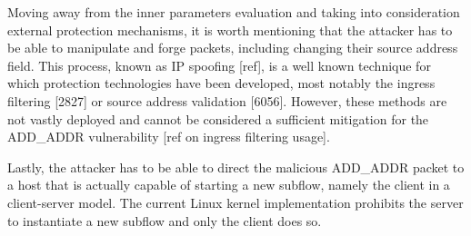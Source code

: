 Moving away from the inner parameters evaluation and taking into consideration external protection mechanisms, it is worth mentioning that the attacker has to be able to manipulate and forge packets, including changing their source address field. This process, known as IP spoofing [ref], is a well known technique for which protection technologies have been developed, most notably the ingress filtering [2827] or source address validation [6056]. However, these methods are not vastly deployed and cannot be considered a sufficient mitigation for the ADD\_ADDR vulnerability [ref on ingress filtering usage].

Lastly, the attacker has to be able to direct the malicious ADD\_ADDR packet to a host that is actually capable of starting a new subflow, namely the client in a client-server model. The current Linux kernel implementation prohibits the server to instantiate a new subflow and only the client does so.
